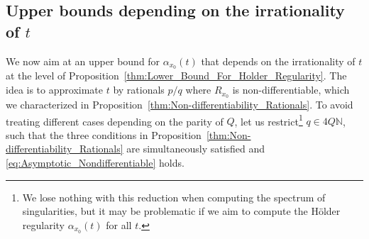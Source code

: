 \documentclass[11pt,reqno]{amsart}
\theoremstyle{definition}
\begin{document}
\subsection{Upper bounds depending on the irrationality of $t$}
\label{sec:Rational_x0_Irrational_t}
We now aim at an upper bound for $\alpha_{x_0}(t)$
that depends on the irrationality of $t$ at the level of Proposition~\ref{thm:Lower_Bound_For_Holder_Regularity}.
The idea is to approximate $t$ by rationals $p/q$ where $R_{x_0}$ is non-differentiable, which we characterized in Proposition~\ref{thm:Non-differentiability_Rationals}.
To avoid treating different cases depending on the parity of $Q$,  
let us restrict\footnote{We lose nothing with this reduction when computing the spectrum of singularities, but it may be problematic if we aim to compute the H\"older regularity $\alpha_{x_0}(t)$ for all $t$.   } $q \in 4Q \mathbb N$, 
such that the three conditions in Proposition~\ref{thm:Non-differentiability_Rationals} are simultaneously satisfied
and \eqref{eq:Asymptotic_Nondifferentiable} holds.
%
\end{document}
